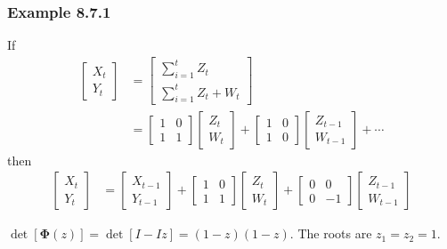 \documentclass{beamer}
\begin{document}
\begin{frame}
\frametitle{Example 8.7.1}

If
\begin{align*}
\left[\begin{array}{c}
X_t \\
Y_t
\end{array}\right]
&=
\left[\begin{array}{c}
\sum_{i=1}^t Z_t \\
\sum_{i=1}^t Z_t + W_t
\end{array}\right] \\
&=
\left[ \begin{array}{cc}
1 & 0 \\
1 & 1
\end{array}\right]
\left[\begin{array}{c}
Z_t \\
W_t
\end{array}\right] 
+
\left[ \begin{array}{cc}
1 & 0 \\
1 & 0
\end{array}\right]
\left[\begin{array}{c}
Z_{t-1} \\
W_{t-1}
\end{array}\right]+ \cdots
\end{align*}
then
\begin{align*}
\left[\begin{array}{c}
X_t \\
Y_t
\end{array}\right]
&=
\left[\begin{array}{c}
X_{t-1} \\
Y_{t-1}
\end{array}\right]
+
\left[\begin{array}{cc}
1 & 0 \\
1 & 1
\end{array}\right]
\left[\begin{array}{c}
Z_{t} \\
W_{t}
\end{array}\right]
+
\left[\begin{array}{cc}
0 & 0 \\
0 & -1
\end{array}\right]
\left[\begin{array}{c}
Z_{t-1} \\
W_{t-1}
\end{array}\right]
\end{align*}
\pause

$\det[\bm{\Phi}(z)] = \det[I - Iz] = (1-z)(1-z)$. The roots are $z_1 = z_2 = 1$.



\end{frame}
\end{document}
